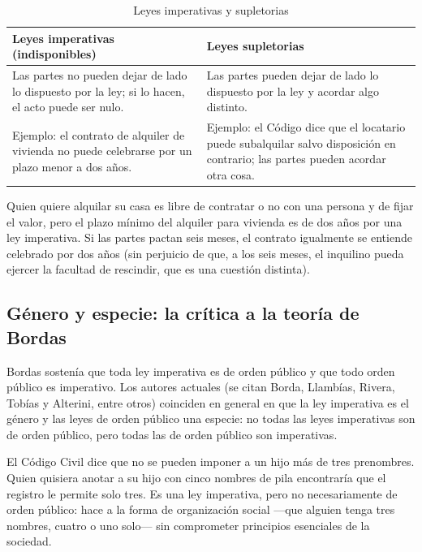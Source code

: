 \documentclass[12pt,oneside]{book}
\begin{document}
\begin{table}[H]
\centering
\begin{tabularx}{\textwidth}{YY}
\toprule
\textbf{Leyes imperativas (indisponibles)} & \textbf{Leyes supletorias} \\
\midrule
Las partes no pueden dejar de lado lo dispuesto por la ley; si lo hacen, el acto puede ser nulo. & Las partes pueden dejar de lado lo dispuesto por la ley y acordar algo distinto. \\
Ejemplo: el contrato de alquiler de vivienda no puede celebrarse por un plazo menor a dos años. & Ejemplo: el Código dice que el locatario puede subalquilar salvo disposición en contrario; las partes pueden acordar otra cosa. \\
\bottomrule
\end{tabularx}
\caption{Leyes imperativas y supletorias}
\end{table}

\begin{ejemplo}
Quien quiere alquilar su casa es libre de contratar o no con una persona y de fijar el valor, pero el plazo mínimo del alquiler para vivienda es de dos años por una ley imperativa. Si las partes pactan seis meses, el contrato igualmente se entiende celebrado por dos años (sin perjuicio de que, a los seis meses, el inquilino pueda ejercer la facultad de rescindir, que es una cuestión distinta).
\end{ejemplo}

\subsection{Género y especie: la crítica a la teoría de Bordas}

Bordas sostenía que toda ley imperativa es de orden público y que todo orden público es imperativo. Los autores actuales (se citan Borda, Llambías, Rivera, Tobías y Alterini, entre otros) coinciden en general en que la ley imperativa es el género y las leyes de orden público una especie: no todas las leyes imperativas son de orden público, pero todas las de orden público son imperativas.

\begin{ejemplo}
El Código Civil dice que no se pueden imponer a un hijo más de tres prenombres. Quien quisiera anotar a su hijo con cinco nombres de pila encontraría que el registro le permite solo tres. Es una ley imperativa, pero no necesariamente de orden público: hace a la forma de organización social ---que alguien tenga tres nombres, cuatro o uno solo--- sin comprometer principios esenciales de la sociedad.
\end{ejemplo}
\end{document}
